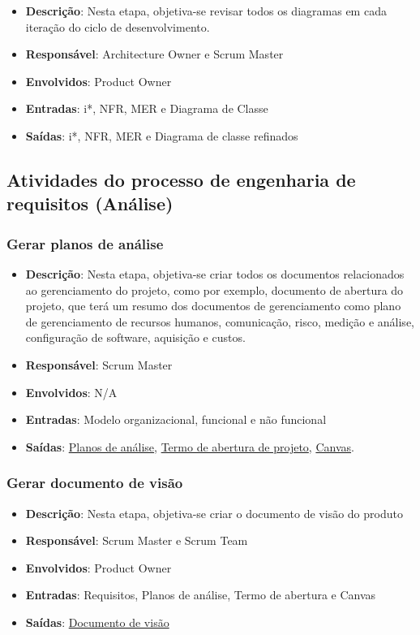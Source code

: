 \begin{itemize}
  \item \textbf{Descrição}: Nesta etapa, objetiva-se revisar todos os diagramas em cada iteração do ciclo de desenvolvimento.
  \item \textbf{Responsável}: Architecture Owner e Scrum Master
  \item \textbf{Envolvidos}: Product Owner
  \item \textbf{Entradas}: i*, NFR, MER e Diagrama de Classe
  \item \textbf{Saídas}: i*, NFR, MER e Diagrama de classe refinados
\end{itemize}

\subsection{Atividades do processo de engenharia de requisitos (Análise)}

\subsubsection{Gerar planos de análise}

\begin{itemize}
  \item \textbf{Descrição}: Nesta etapa, objetiva-se criar todos os documentos relacionados ao gerenciamento do projeto, como por exemplo, documento de abertura do projeto, que terá um resumo dos documentos de gerenciamento como plano de gerenciamento de recursos humanos, comunicação, risco, medição e análise, configuração de software, aquisição e custos.
  \item \textbf{Responsável}: Scrum Master
  \item \textbf{Envolvidos}: N/A
  \item \textbf{Entradas}: Modelo organizacional, funcional e não funcional
  \item \textbf{Saídas}: \href{https://github.com/VictorArnaud/TBL/wiki/Planos-de-gerenciamento}{Planos de análise}, \href{https://victorarnaud.github.io/TBL/tap/}{Termo de abertura de projeto}, \href{https://victorarnaud.github.io/TBL/canvas/}{Canvas}.
\end{itemize}

\subsubsection{Gerar documento de visão}

\begin{itemize}
  \item \textbf{Descrição}: Nesta etapa, objetiva-se criar o documento de visão do produto
  \item \textbf{Responsável}: Scrum Master e Scrum Team
  \item \textbf{Envolvidos}: Product Owner
  \item \textbf{Entradas}: Requisitos, Planos de análise, Termo de abertura e Canvas
  \item \textbf{Saídas}: \href{https://victorarnaud.github.io/TBL/visao/}{Documento de visão}
\end{itemize}

